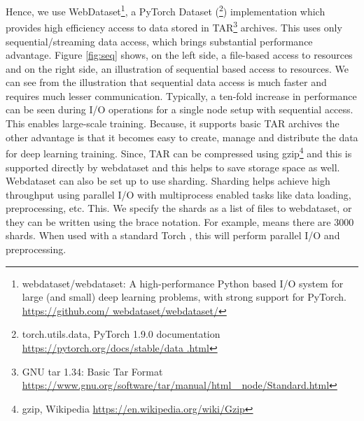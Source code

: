 Hence, we use WebDataset\footnote{webdataset/webdataset: A high-performance Python based I/O system for large (and small) deep learning problems, with strong support for PyTorch. \href{https://github.com/webdataset/webdataset/}{https://github.com/ webdataset/webdataset/}}\cite{Aizman2019HighLearning}, a PyTorch Dataset (\footnote{torch.utils.data, PyTorch 1.9.0 documentation \href{https://pytorch.org/docs/stable/data.html}{https://pytorch.org/docs/stable/data .html}}) implementation which provides high efficiency access to data stored in TAR\footnote{GNU tar 1.34: Basic Tar Format \href{https://www.gnu.org/software/tar/manual/html_node/Standard.html}{https://www.gnu.org/software/tar/manual/html\_ node/Standard.html}} archives. This uses only sequential/streaming data access, which brings substantial performance advantage. Figure \ref{fig:seq} shows, on the left side, a file-based access to resources and on the right side, an illustration of sequential based access to resources. We can see from the illustration that sequential data access is much faster and requires much lesser communication. Typically, a ten-fold increase in performance can be seen during I/O operations\cite{Aizman2019HighLearning} for a single node setup with sequential access. This enables large-scale training. Because, it supports basic TAR archives the other advantage is that it becomes easy to create, manage and distribute the data for deep learning training. Since, TAR can be compressed using gzip\footnote{gzip, Wikipedia \href{https://en.wikipedia.org/wiki/Gzip}{https://en.wikipedia.org/wiki/Gzip}} and this is supported directly by webdataset and this helps to save storage space as well. Webdataset can also be set up to use sharding. Sharding helps achieve high throughput using parallel I/O with multiprocess enabled tasks like data loading, preprocessing, etc. This. We specify the shards as a list of files to webdataset, or they can be written using the brace notation. For example,  means there are 3000 shards. When used with a standard Torch , this will perform parallel I/O and preprocessing. 


